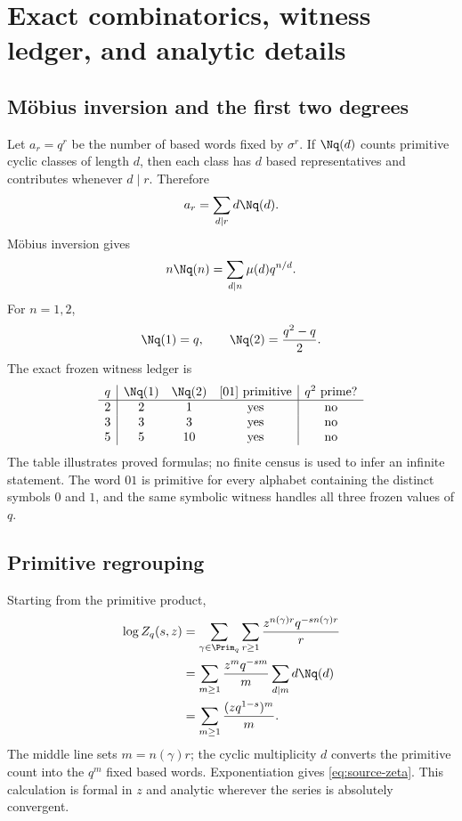 \section{Exact combinatorics, witness ledger, and analytic details}
\label{app:exact-details}

\subsection{Möbius inversion and the first two degrees}

Let $a_r=q^r$ be the number of based words fixed by $\sigma^r$. If
$\Nq(d)$ counts primitive cyclic classes of length $d$, then each class has
$d$ based representatives and contributes whenever $d\mid r$. Therefore
\[
 a_r=\sum_{d\mid r}d\Nq(d).
\]
Möbius inversion gives
\[
 n\Nq(n)=\sum_{d\mid n}\mu(d)q^{n/d}.
\]
For $n=1,2$,
\[
 \Nq(1)=q,
 \qquad
 \Nq(2)=\frac{q^2-q}{2}.
\]
The exact frozen witness ledger is
\[
\begin{array}{c|ccc|c}
q&\Nq(1)&\Nq(2)&[01]\text{ primitive}&q^2\text{ prime?}\\
\hline
2&2&1&\text{yes}&\text{no}\\
3&3&3&\text{yes}&\text{no}\\
5&5&10&\text{yes}&\text{no}
\end{array}
\]
The table illustrates proved formulas; no finite census is used to infer an
infinite statement. The word $01$ is primitive for every alphabet containing
the distinct symbols $0$ and $1$, and the same symbolic witness handles all
three frozen values of $q$.

\subsection{Primitive regrouping}

Starting from the primitive product,
\begin{align*}
 \log Z_q(s,z)
 &=\sum_{\gamma\in\Prim_q}\sum_{r\ge1}
   \frac{z^{n(\gamma)r}q^{-s n(\gamma)r}}{r}\\
 &=\sum_{m\ge1}\frac{z^mq^{-sm}}{m}
   \sum_{d\mid m}d\Nq(d)\\
 &=\sum_{m\ge1}\frac{(zq^{1-s})^m}{m}.
\end{align*}
The middle line sets $m=n(\gamma)r$; the cyclic multiplicity $d$ converts the
primitive count into the $q^m$ fixed based words. Exponentiation gives
\cref{eq:source-zeta}. This calculation is formal in $z$ and analytic wherever
the series is absolutely convergent.

